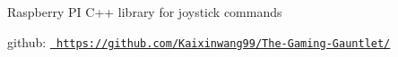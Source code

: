 Raspberry PI C++ library for joystick commands

github\+: \href{https://github.com/Kaixinwang99/The-Gaming-Gauntlet/}{\texttt{ https\+://github.\+com/\+Kaixinwang99/\+The-\/\+Gaming-\/\+Gauntlet/}} 